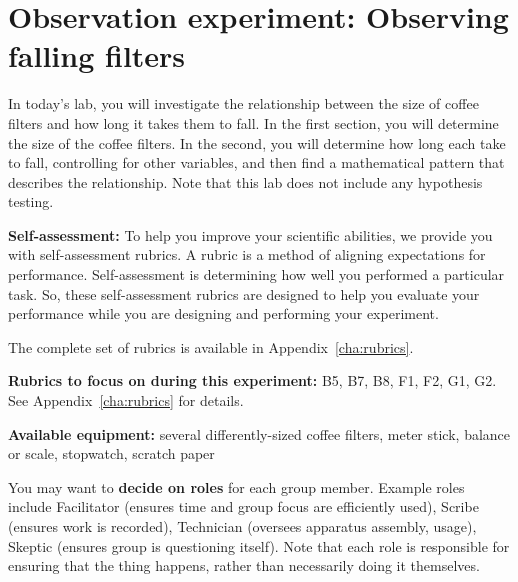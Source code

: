 \section{Observation experiment: Observing falling filters}

In today's lab, you will investigate the relationship between the size of coffee filters and how long it takes them to fall. In the first section, you will determine the size of the coffee filters. In the second, you will determine how long each take to fall, controlling for other variables, and then find a mathematical pattern that describes the relationship. Note that this lab does not include any hypothesis testing.

\begin{framed}
	\textbf{Self-assessment:} To help you improve your scientific abilities, we provide you with self-assessment rubrics.
	A rubric is a method of aligning expectations for performance.
	Self-assessment is determining how well you performed a particular task.
	So, these self-assessment rubrics are designed to help you evaluate your performance while you are designing and performing your experiment.
	
	The complete set of rubrics is available in Appendix~\ref{cha:rubrics}.
\end{framed}	

\textbf{Rubrics to focus on during this experiment:} B5, B7, B8, F1, F2, G1, G2. See Appendix~\ref{cha:rubrics} for details.

\textbf{Available equipment:} several differently-sized coffee filters, meter stick, balance or scale, stopwatch, scratch paper%

You may want to \textbf{decide on roles} for each group member. Example roles include Facilitator (ensures time and group focus are efficiently used), Scribe (ensures work is recorded), Technician (oversees apparatus assembly, usage), Skeptic (ensures group is questioning itself). Note that each role is responsible for ensuring that the thing happens, rather than necessarily doing it themselves.

